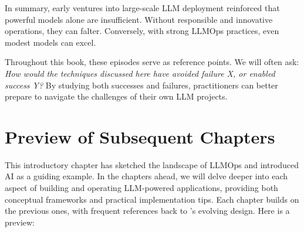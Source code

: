 In summary, early ventures into large-scale LLM deployment reinforced that powerful models alone are insufficient. Without responsible and innovative operations, they can falter. Conversely, with strong LLMOps practices, even modest models can excel.  

Throughout this book, these episodes serve as reference points. We will often ask: \emph{How would the techniques discussed here have avoided failure X, or enabled success Y?} By studying both successes and failures, practitioners can better prepare to navigate the challenges of their own LLM projects.

\section{Preview of Subsequent Chapters}
\label{sec:preview}

This introductory chapter has sketched the landscape of LLMOps and introduced \ishtar{} AI as a guiding example. In the chapters ahead, we will delve deeper into each aspect of building and operating LLM-powered applications, providing both conceptual frameworks and practical implementation tips. Each chapter builds on the previous ones, with frequent references back to \ishtar{}’s evolving design. Here is a preview:

